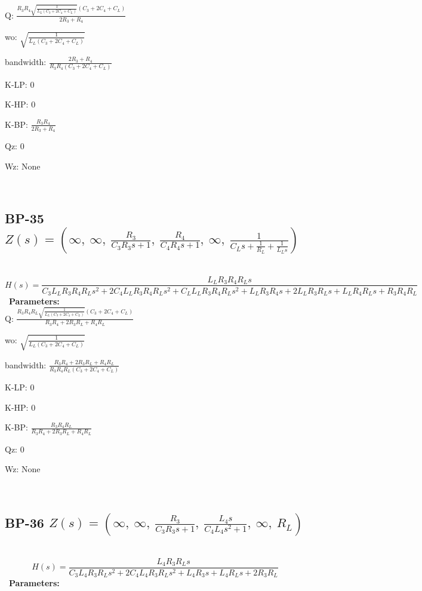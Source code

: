 \documentclass{article}
\begin{document}
Q: $\frac{R_{3} R_{4} \sqrt{\frac{1}{L_{L} \left(C_{3} + 2 C_{4} + C_{L}\right)}} \left(C_{3} + 2 C_{4} + C_{L}\right)}{2 R_{3} + R_{4}}$\ 

wo: $\sqrt{\frac{1}{L_{L} \left(C_{3} + 2 C_{4} + C_{L}\right)}}$\ 

bandwidth: $\frac{2 R_{3} + R_{4}}{R_{3} R_{4} \left(C_{3} + 2 C_{4} + C_{L}\right)}$\ 

K-LP: $0$\ 

K-HP: $0$\ 

K-BP: $\frac{R_{3} R_{4}}{2 R_{3} + R_{4}}$\ 

Qz: $0$\ 

Wz: $\text{None}$\ 

\ 

\subsection{BP-35 $Z(s) = \left( \infty, \  \infty, \  \frac{R_{3}}{C_{3} R_{3} s + 1}, \  \frac{R_{4}}{C_{4} R_{4} s + 1}, \  \infty, \  \frac{1}{C_{L} s + \frac{1}{R_{L}} + \frac{1}{L_{L} s}}\right)$ } \ 
\textbf{\[H(s) = \frac{L_{L} R_{3} R_{4} R_{L} s}{C_{3} L_{L} R_{3} R_{4} R_{L} s^{2} + 2 C_{4} L_{L} R_{3} R_{4} R_{L} s^{2} + C_{L} L_{L} R_{3} R_{4} R_{L} s^{2} + L_{L} R_{3} R_{4} s + 2 L_{L} R_{3} R_{L} s + L_{L} R_{4} R_{L} s + R_{3} R_{4} R_{L}}\] } \ 
\textbf{Parameters:}\\ 

Q: $\frac{R_{3} R_{4} R_{L} \sqrt{\frac{1}{L_{L} \left(C_{3} + 2 C_{4} + C_{L}\right)}} \left(C_{3} + 2 C_{4} + C_{L}\right)}{R_{3} R_{4} + 2 R_{3} R_{L} + R_{4} R_{L}}$\ 

wo: $\sqrt{\frac{1}{L_{L} \left(C_{3} + 2 C_{4} + C_{L}\right)}}$\ 

bandwidth: $\frac{R_{3} R_{4} + 2 R_{3} R_{L} + R_{4} R_{L}}{R_{3} R_{4} R_{L} \left(C_{3} + 2 C_{4} + C_{L}\right)}$\ 

K-LP: $0$\ 

K-HP: $0$\ 

K-BP: $\frac{R_{3} R_{4} R_{L}}{R_{3} R_{4} + 2 R_{3} R_{L} + R_{4} R_{L}}$\ 

Qz: $0$\ 

Wz: $\text{None}$\ 

\ 

\subsection{BP-36 $Z(s) = \left( \infty, \  \infty, \  \frac{R_{3}}{C_{3} R_{3} s + 1}, \  \frac{L_{4} s}{C_{4} L_{4} s^{2} + 1}, \  \infty, \  R_{L}\right)$ } \ 
\textbf{\[H(s) = \frac{L_{4} R_{3} R_{L} s}{C_{3} L_{4} R_{3} R_{L} s^{2} + 2 C_{4} L_{4} R_{3} R_{L} s^{2} + L_{4} R_{3} s + L_{4} R_{L} s + 2 R_{3} R_{L}}\] } \ 
\textbf{Parameters:}\\ 
\end{document}
